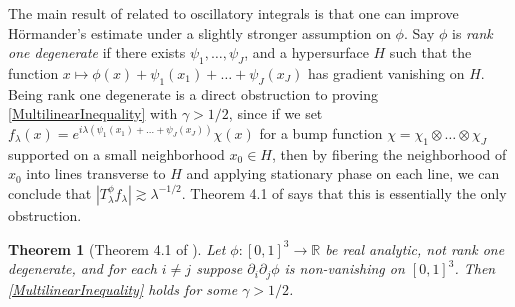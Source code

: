 \documentclass[12pt]{amsart}
\newtheorem{thm}{Theorem}
\newcommand*{\R}{\mathbb{R}}
\begin{document}
%
%
%
%
%
%
%
%
%

The main result of \cite{ChristTopicPaper} related to oscillatory integrals is that one can improve H\"{o}rmander's estimate under a slightly stronger assumption on $\phi$. Say $\phi$ is \emph{rank one degenerate} if there exists $\psi_1,\dots,\psi_J$, and a hypersurface $H$ such that the function $x \mapsto \phi(x) + \psi_1(x_1) + \dots + \psi_J(x_J)$ has gradient vanishing on $H$. Being rank one degenerate is a direct obstruction to proving \eqref{MultilinearInequality} with $\gamma > 1/2$, since if we set $f_\lambda(x) = e^{i \lambda (\psi_1(x_1) + \dots + \psi_J(x_J))} \chi(x)$ for a bump function $\chi = \chi_1 \otimes \dots \otimes \chi_J$ supported on a small neighborhood $x_0 \in H$, then by fibering the neighborhood of $x_0$ into lines transverse to $H$ and applying stationary phase on each line, we can conclude that $|T^\phi_\lambda f_\lambda| \gtrsim \lambda^{-1/2}$. Theorem 4.1 of \cite{ChristTopicPaper} says that this is essentially the only obstruction.

\begin{thm}[Theorem 4.1 of \cite{ChristTopicPaper}]
	Let $\phi: [0,1]^3 \to \R$ be real analytic, not rank one degenerate, and for each $i \neq j$ suppose $\partial_i \partial_j \phi$ is non-vanishing on $[0,1]^3$. Then \eqref{MultilinearInequality} holds for some $\gamma > 1/2$.
\end{thm}
\end{document}
